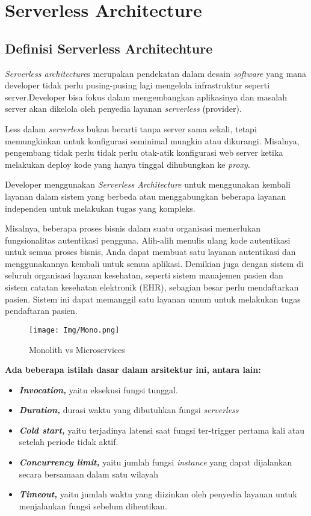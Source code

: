 
\chapter{Serverless Architecture}
	
\section{Definisi Serverless Architechture}
\emph{Serverless architecture}s merupakan pendekatan dalam desain \emph{software} yang mana developer tidak perlu pusing-pusing lagi mengelola infrastruktur seperti server.Developer bisa fokus dalam mengembangkan aplikasinya dan masalah server akan dikelola oleh penyedia layanan \emph{serverless} (provider).

Less dalam \emph{serverless} bukan berarti tanpa server sama sekali, tetapi memungkinkan untuk konfigurasi seminimal mungkin atau dikurangi. Misalnya, pengembang tidak perlu tidak perlu otak-atik konfigurasi web server ketika melakukan deploy kode yang hanya tinggal dihubungkan ke \emph{proxy}.

Developer menggunakan \emph{Serverless Architecture} untuk menggunakan kembali layanan dalam sistem yang berbeda atau menggabungkan beberapa layanan independen untuk melakukan tugas yang kompleks. 

Misalnya, beberapa proses bisnis dalam suatu organisasi memerlukan fungsionalitas autentikasi pengguna. Alih-alih menulis ulang kode autentikasi untuk semua proses bisnis, Anda dapat membuat satu layanan autentikasi dan menggunakannya kembali untuk semua aplikasi. Demikian juga dengan sistem di seluruh organisasi layanan kesehatan, seperti sistem manajemen pasien dan sistem catatan kesehatan elektronik (EHR), sebagian besar perlu mendaftarkan pasien. Sistem ini dapat memanggil satu layanan umum untuk melakukan tugas pendaftaran pasien.

\begin{figure}
	\centering
	\texttt{[image: Img/Mono.png]}
	\caption{Monolith vs Microservices}
	\label {Gambar 8.1}
\end{figure}

\textbf{Ada beberapa istilah dasar dalam arsitektur ini, antara lain:}

\begin{itemize}
	\item \textbf{\textit{Invocation,}} yaitu eksekusi fungsi tunggal.
	\item \textbf{\textit{Duration,}} durasi waktu yang dibutuhkan fungsi \emph{serverless}
	\item \textbf{\textit{Cold start,}} yaitu terjadinya latensi saat fungsi ter-trigger pertama kali atau setelah periode tidak aktif.
	\item \textbf{\textit{Concurrency limit,}} yaitu jumlah fungsi \emph{instance} yang dapat dijalankan secara bersamaan dalam satu wilayah
	\item \textbf{\textit{Timeout,}} yaitu jumlah waktu yang diizinkan oleh penyedia layanan untuk menjalankan fungsi sebelum dihentikan.
\end{itemize}

